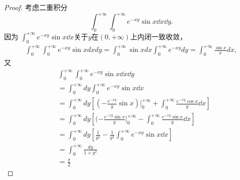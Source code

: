 \begin{proof}
考虑二重积分
$$\int_0^{+\infty}\int_0^{+\infty}e^{-xy}\sin x\dd x\dd y.$$
因为 $\int_0^{+\infty}e^{-xy}\sin x\dd x$关于$y$在$(0,+\infty)$上内闭一致收敛，
\begin{align*}
  \int_0^{+\infty}\int_0^{+\infty}e^{-xy}\sin xdxdy
  =\int_0^{+\infty}\sin xdx\int_0^{+\infty}e^{-xy}dy 
  =\int_0^{+\infty}\frac{\sin x}xdx,
\end{align*}
  又
\begin{align*}
  &\int_0^{+\infty}\int_0^{+\infty}e^{-xy}\sin x\dd x\dd y\\
  &=\int_0^{+\infty}dy\int_0^{+\infty}e^{-xy}\sin x\dd x\\
  &=\int_0^{+\infty}dy[(-\frac{e^{-xy}}{y}\sin x)|_0^{+\infty}+\int_0^{+\infty}\frac{e^{-xy}\cos x}{y}\dd x]\\
  &=\int_0^{+\infty}dy[(-\frac{e^{-xy}\sin x}{y}|_0^{+\infty}-\int_0^{+\infty}\frac{e^{-xy}\sin x}{y}\dd x]\\
  &=\int_0^{+\infty}dy[\frac{1}{y^2}-\frac{1}{y^2}\int_0^{+\infty}e^{-xy}\sin x\dd x]\\
  &=\int_0^{+\infty}\frac{dy}{1+y^2}\\
  &=\frac{\pi}{2}
\end{align*}   
\end{proof}

